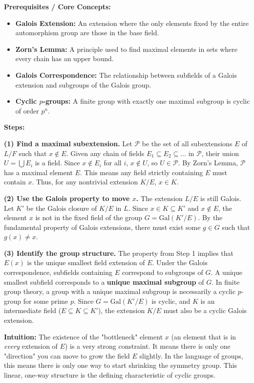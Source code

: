 \begin{solution}
\textbf{Prerequisites / Core Concepts:}
\begin{itemize}
    \item \textbf{Galois Extension:} An extension where the only elements fixed by the entire automorphism group are those in the base field.
    \item \textbf{Zorn's Lemma:} A principle used to find maximal elements in sets where every chain has an upper bound.
    \item \textbf{Galois Correspondence:} The relationship between subfields of a Galois extension and subgroups of the Galois group.
    \item \textbf{Cyclic $p$-groups:} A finite group with exactly one maximal subgroup is cyclic of order $p^n$.
\end{itemize}

\textbf{Steps:}

\textbf{(1) Find a maximal subextension.}
Let $\mathcal{P}$ be the set of all subextensions $E$ of $L/F$ such that $x \notin E$.
Given any chain of fields $E_1 \subseteq E_2 \subseteq \dots$ in $\mathcal{P}$, their union $U = \bigcup E_i$ is a field. Since $x \notin E_i$ for all $i$, $x \notin U$, so $U \in \mathcal{P}$.
By Zorn's Lemma, $\mathcal{P}$ has a maximal element $E$.
This means any field strictly containing $E$ must contain $x$. Thus, for any nontrivial extension $K/E$, $x \in K$.

\textbf{(2) Use the Galois property to move $x$.}
The extension $L/E$ is still Galois. Let $K'$ be the Galois closure of $K/E$ in $L$.
Since $x \in K \subseteq K'$ and $x \notin E$, the element $x$ is not in the fixed field of the group $G = \text{Gal}(K'/E)$.
By the fundamental property of Galois extensions, there must exist some $g \in G$ such that $g(x) \neq x$.

\textbf{(3) Identify the group structure.}
The property from Step 1 implies that $E(x)$ is the unique smallest field extension of $E$.
Under the Galois correspondence, subfields containing $E$ correspond to subgroups of $G$.
A unique smallest subfield corresponds to a \textbf{unique maximal subgroup} of $G$.
In finite group theory, a group with a unique maximal subgroup is necessarily a cyclic $p$-group for some prime $p$.
Since $G = \text{Gal}(K'/E)$ is cyclic, and $K$ is an intermediate field ($E \subseteq K \subseteq K'$), the extension $K/E$ must also be a cyclic Galois extension.

\textbf{Intuition:}
The existence of the "bottleneck" element $x$ (an element that is in \textit{every} extension of $E$) is a very strong constraint. It means there is only one "direction" you can move to grow the field $E$ slightly. In the language of groups, this means there is only one way to start shrinking the symmetry group. This linear, one-way structure is the defining characteristic of cyclic groups.
\end{solution}

